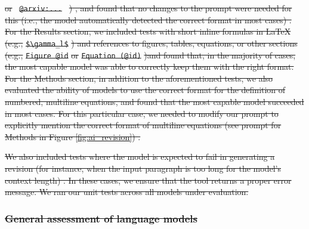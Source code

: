 \documentclass[
]{article}
\providecommand{\DIFdeltex}[1]{{\protect\color{red}\sout{#1}}}                      %
\providecommand{\DIFdel}[1]{\texorpdfstring{\DIFdeltex{#1}}{}} %
\begin{document}
\DIFdel{or }\texttt{%
\DIFdel{@arxiv:...}%
}%
\DIFdel{) , and found that no changes to the prompt were needed for this (i.e., the model automatically detected the correct format in most cases) .
For the Results section, we included tests with short inline formulas in LaTeX (e.g., }\texttt{\DIFdel{\$\textbackslash{}gamma\_l\$}}%
\DIFdel{) and references to figures, tables, equations, or other sections (e.g., }\texttt{\DIFdel{Figure\ @id}} %
\DIFdel{or }\texttt{\DIFdel{Equation\ (@id)}}%
\DIFdel{)and found that, in the majority of cases, the most capable model was able to correctly keep them with the right format.
For the Methods section, in addition to the aforementioned tests, we also evaluated the ability of models to use the correct format for the definition of numbered, multiline equations, and found that the most capable model succeeded in most cases.
For this particular case, we needed to modify our prompt to explicitly mention the correct format of multiline equations (see prompt for Methods in Figure \ref{fig:ai_revision}) .
}%

\DIFdel{We also included tests where the model is expected to fail in generating a revision (for instance, when the input paragraph is too long for the model's context length) .
In these cases, we ensure that the tool returns a proper error message.
We ran our unit tests across all models under evaluation.
}%

\subsubsection{\DIFdel{General assessment of language models}}
\addtocounter{subsubsection}{-1}%
\end{document}
